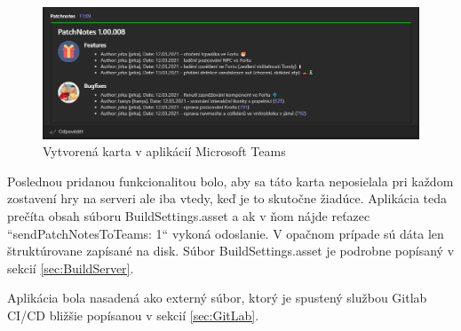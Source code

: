 \documentclass[slovak, bachelorpractice]{diploma}
\begin{document}
\begin{figure}[!htbp]
	\centering
	\includegraphics[width=1\textwidth]{Pictures/gitlogger.png}
	\caption{Vytvorená karta v aplikácií Microsoft Teams}
	\label{pic:Logger}
\end{figure}

Poslednou pridanou funkcionalitou bolo, aby sa táto karta neposielala pri každom zostavení hry na serveri ale iba vtedy, keď je to skutočne žiadúce. Aplikácia teda prečíta obsah súboru BuildSettings.asset a ak v ňom nájde reťazec ``sendPatchNotesToTeams: 1`` vykoná odoslanie. V opačnom prípade sú dáta len štruktúrovane zapísané na disk. Súbor BuildSettings.asset je podrobne popísaný v sekcií \ref{sec:BuildServer}.

Aplikácia bola nasadená ako externý súbor, ktorý je spustený službou Gitlab CI/CD bližšie popísanou v sekcií \ref{sec:GitLab}.
\end{document}

